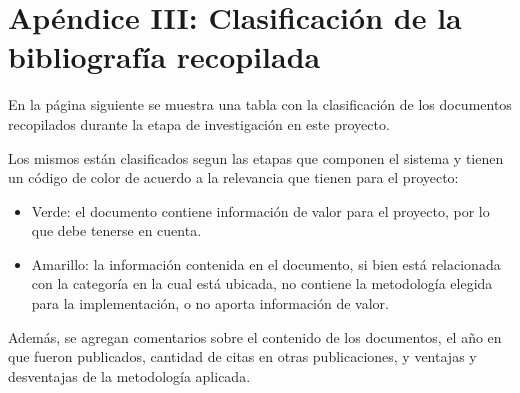 \section{Apéndice III: Clasificación de la bibliografía recopilada}
\label{tablabiblio}
En la página siguiente se muestra una tabla con la clasificación de los documentos recopilados durante la etapa de investigación en este proyecto.

Los mismos están clasificados segun las etapas que componen el sistema y tienen un código de color de acuerdo a la relevancia que tienen para el proyecto:
\begin{itemize}
	\item Verde: el documento contiene información de valor para el proyecto, por lo que debe tenerse en cuenta.
	\item Amarillo: la información contenida en el documento, si bien está relacionada con la categoría en la cual está ubicada, no contiene la metodología elegida para la implementación, o no aporta información de valor. 
\end{itemize}

Además, se agregan comentarios sobre el contenido de los documentos, el año en que fueron publicados, cantidad de citas en otras publicaciones, y ventajas y desventajas de la metodología aplicada.


